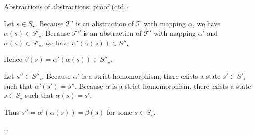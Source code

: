 \documentclass{gkibeamer}
\begin{document}
\begin{frame}{Abstractions of abstractions: proof (ctd.)}
  \begin{proofmid}
    
    Let $s \in S_\star$. Because $\mathcal T'$ is an abstraction of
    $\mathcal T$ with mapping $\alpha$, we have $\alpha(s) \in S'_\star$.
    Because $\mathcal T''$ is an abstraction of $\mathcal T'$ with
    mapping $\alpha'$ and $\alpha(s) \in S'_\star$, we have
    $\alpha'(\alpha(s)) \in S''_\star$.

    Hence $\beta(s) = \alpha'(\alpha(s)) \in S''_\star$.

    \pause
    \medskip

    
    Let $s'' \in S''_\star$. Because $\alpha'$ is a strict
    homomorphism, there exists a state $s' \in S'_\star$ such that
    $\alpha'(s') = s''$. Because $\alpha$ is a strict homomorphism,
    there exists a state $s \in S_\star$ such that $\alpha(s) = s'$.

    Thus $s'' = \alpha'(\alpha(s)) = \beta(s)$ for some $s \in S_\star$.

    \medskip

    \dots
  \end{proofmid}
\end{frame}
\end{document}
